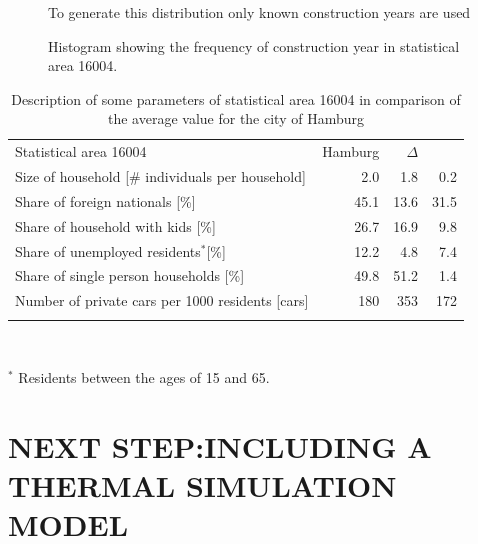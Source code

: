 \documentclass[11pt]{IJM-article}
\begin{document}
\begin{figure}[htb] 
    \centering 
    \caption{Histogram showing the frequency of construction year in
    statistical area 16004.}\label{fig:8} 
    
    \begin{flushleft}
    \begin{footnotesize}
        To generate this distribution only known construction years are used
    \end{footnotesize}
    \end{flushleft}
\end{figure}

\begin{table}[htb]
    \centering 
    \caption{Description of some parameters of statistical area 16004 in
    comparison of the average value for the city of Hamburg}\label{tab:6}
    \begin{tabular}{lrrr}
        \addlinespace
        \toprule
        Statistical area 16004 & Hamburg & $\Delta$\\
        Size of household [\# individuals per household]&   2.0 &   1.8 &  0.2\\ 
        Share of foreign nationals [\%]                 &  45.1 &  13.6 & 31.5\\ 
        Share of household with kids [\%]               &  26.7 &  16.9 &  9.8\\ 
        Share of unemployed residents$^*$[\%]           &  12.2 &   4.8 &  7.4\\ 
        Share of single person households [\%]          &  49.8 &  51.2 &  1.4\\ 
        Number of private cars per 1000 residents [cars]& 180   & 353   &172  \\ 
        \bottomrule \addlinespace 
    \end{tabular} \\ 
    \begin{footnotesize}
        $^*$ Residents between the ages of 15 and 65.
    \end{footnotesize}
\end{table}

\section{NEXT STEP:\@ INCLUDING A THERMAL SIMULATION MODEL}\label{sec:9}
\end{document}
